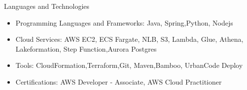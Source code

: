 \documentclass[]{mcdowellcv}
\begin{document}
    \makeheader

    \begin{cvsection}{Languages and Technologies}
        \begin{cvsubsection}{}{}{}
            \begin{itemize}
                \item Programming Languages and Frameworks: Java, Spring,Python, Nodejs
                \item Cloud Services: AWS EC2, ECS Fargate, NLB, S3, Lambda, Glue, Athena, Lakeformation, Step Function,Aurora Postgres
                \item Tools: CloudFormation,Terraform,Git, Maven,Bamboo, UrbanCode Deploy
                \item Certifications: AWS Developer - Associate, AWS Cloud Practitioner
            \end{itemize}
        \end{cvsubsection}
    \end{cvsection}
\end{document}
